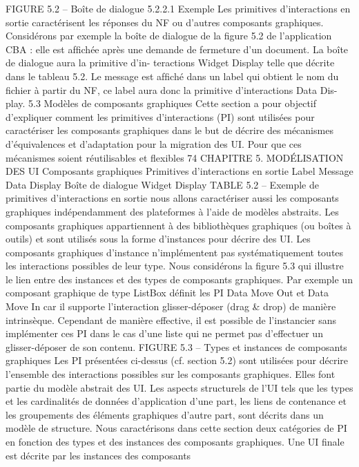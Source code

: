 \documentclass{article}
\begin{document}
FIGURE 5.2 – Boîte de dialogue
5.2.2.1
Exemple
Les primitives d’interactions en sortie caractérisent les réponses du NF ou d’autres composants
graphiques.
Considérons par exemple la boîte de dialogue de la ﬁgure 5.2 de l’application CBA : elle est
afﬁchée après une demande de fermeture d’un document. La boîte de dialogue aura la primitive d’in-
teractions Widget Display telle que décrite dans le tableau 5.2. Le message est afﬁché dans un label
qui obtient le nom du ﬁchier à partir du NF, ce label aura donc la primitive d’interactions Data Dis-
play.
5.3
Modèles de composants graphiques
Cette section a pour objectif d’expliquer comment les primitives d’interactions (PI) sont utilisées
pour caractériser les composants graphiques dans le but de décrire des mécanismes d’équivalences
et d’adaptation pour la migration des UI. Pour que ces mécanismes soient réutilisables et ﬂexibles
74
CHAPITRE 5. MODÉLISATION DES UI
Composants
graphiques
Primitives d’interactions en sortie
Label Message
Data Display
Boîte de dialogue
Widget Display
TABLE 5.2 – Exemple de primitives d’interactions en sortie
nous allons caractériser aussi les composants graphiques indépendamment des plateformes à l’aide de
modèles abstraits.
Les composants graphiques appartiennent à des bibliothèques graphiques (ou boîtes à outils) et
sont utilisés sous la forme d’instances pour décrire des UI. Les composants graphiques d’instance
n’implémentent pas systématiquement toutes les interactions possibles de leur type. Nous considérons
la ﬁgure 5.3 qui illustre le lien entre des instances et des types de composants graphiques. Par exemple
un composant graphique de type ListBox déﬁnit les PI Data Move Out et Data Move In car il
supporte l’interaction glisser-déposer (drag & drop) de manière intrinsèque. Cependant de manière
effective, il est possible de l’instancier sans implémenter ces PI dans le cas d’une liste qui ne permet
pas d’effectuer un glisser-déposer de son contenu.
FIGURE 5.3 – Types et instances de composants graphiques
Les PI présentées ci-dessus (cf. section 5.2) sont utilisées pour décrire l’ensemble des interactions
possibles sur les composants graphiques. Elles font partie du modèle abstrait des UI. Les aspects
structurels de l’UI tels que les types et les cardinalités de données d’application d’une part, les liens
de contenance et les groupements des éléments graphiques d’autre part, sont décrits dans un modèle
de structure. Nous caractérisons dans cette section deux catégories de PI en fonction des types et
des instances des composants graphiques. Une UI ﬁnale est décrite par les instances des composants
\end{document}
